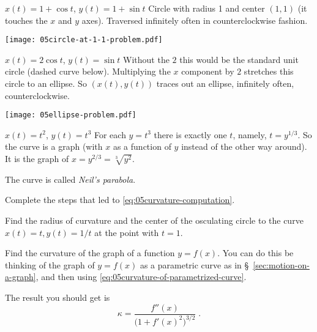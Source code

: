 \begin{multicols}{2}
\subprob  \(x(t) =  1+\cos t \), \(y(t) = 1+\sin t  \)
\answer %
Circle with radius 1 and center $(1,1)$ (it touches the $x$ and $y$ axes).
Traversed infinitely often in counterclockwise fashion.
\begin{center}
  \texttt{[image: 05circle-at-1-1-problem.pdf]}
\end{center}
\endanswer




\subprob  \(x(t) =  2\cos t \), \(y(t) = \sin t  \)
\answer %
Without the $2$ this would be the standard unit circle (dashed curve below).
Multiplying the $x$ component by $2$ stretches this circle to an ellipse.  So
$(x(t), y(t))$ traces out an ellipse, infinitely often, counterclockwise.




\begin{center}
  \texttt{[image: 05ellipse-problem.pdf]}
\end{center}




\endanswer




\subprob  \(x(t) =  t^2 \), \(y(t) = t^3  \)
\answer %
For each $y=t^3$ there is exactly one $t$, namely, $t=y^{1/3}$.  So the curve is
a graph (with $x$ as a function of $y$ instead of the other way around).  It
is the graph of $x=y^{2/3} = \sqrt[3]{y^2}$.
\begin{center}
  
\end{center}
The curve is called \emph{Neil's parabola}.
\endanswer




\problem Complete the steps that led to \eqref{eq:05curvature-computation}. %




\problem Find the radius of curvature and the center of the osculating circle to %
the curve $x(t)=t, y(t) = 1/t$ at the point with $t=1$.




\problem  Find the curvature of the graph of a function $y=f(x)$.  You %
can do this be thinking of the graph of $y=f(x)$ as a parametric
curve as in \S~\ref{sec:motion-on-a-graph}, and then using
\eqref{eq:05curvature-of-parametrized-curve}.




The result you should get is
\[
\kappa = \frac{f''(x)} {\bigl(1+f'(x)^2\bigr)^{3/2}}\;.
\]





\end{multicols}
